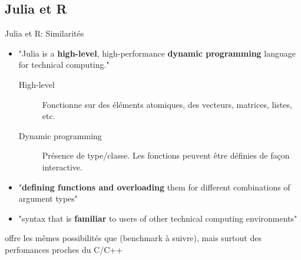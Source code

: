 \subsection{Julia et R}
\begin{frame}{Julia et R: Similarités}
    \begin{itemize}
        \item "Julia is a \textbf{high-level}, high-performance \textbf{dynamic programming} language for technical computing."
            \begin{description}
                \item[High-level] Fonctionne sur des éléments atomiques, des vecteurs, matrices, listes, etc.
                \item[Dynamic programming] Présence de type/classe. Les fonctions peuvent être définies de façon interactive.
            \end{description}
        \item "\textbf{defining functions and overloading} them for different combinations of argument types"
        \item "syntax that is \textbf{familiar} to users of other technical computing environments"
    \end{itemize}
    \par{{\Julia} offre les mêmes possibilités que {\R} (benchmark à suivre), mais surtout des perfomances proches du C/C++}
\end{frame}

